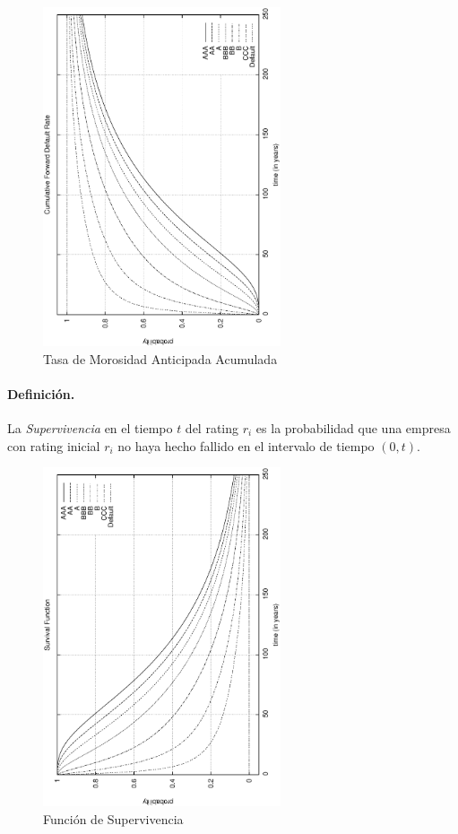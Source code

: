 \begin{figure}[!hb]
\begin{center}
\includegraphics[height=10cm, angle=-90]{./images/tmaa.ps}
\caption{Tasa de Morosidad Anticipada Acumulada}
\label{tmaa}
\end{center}
\end{figure}

\paragraph{Definici\'on.} La \emph{Supervivencia} en el
tiempo $t$ del rating $r_i$ es la probabilidad que una empresa con rating inicial
$r_i$ no haya hecho fallido en el intervalo de tiempo $(0,t)$.

\begin{figure}[!hb]
\begin{center}
\includegraphics[height=10cm, angle=-90]{./images/survival.ps}
\caption{Funci\'on de Supervivencia}
\label{survival}
\end{center}
\end{figure}

